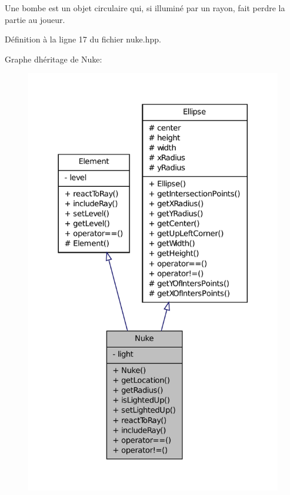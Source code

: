 Une bombe est un objet circulaire qui, si illuminé par un rayon, fait perdre la partie au joueur. 

Définition à la ligne 17 du fichier nuke.\+hpp.



Graphe d\textquotesingle{}héritage de Nuke\+:\nopagebreak
\begin{figure}[H]
\begin{center}
\leavevmode
\includegraphics[width=326pt]{d7/d17/classNuke__inherit__graph}
\end{center}
\end{figure}


